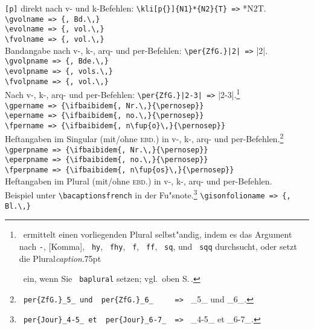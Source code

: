 \documentclass[12pt,a4paper]{article}
\newcommand{\pdfko}[1]{\kern #1pt
                          \strut\ignorespaces}%
\newcommand{\pbs}{\string\ \unskip}
\newcommand{\bs}{\protect\pbs}
\begin{document}
{\verb|[p]| direkt nach v- und k-Befehlen: \verb|\kli[p{}]{N1}*{N2}{T} =>| *{N2}{T}.
\\[.8ex]%
\verb|\gvolname => {, Bd.\,}| \\[-.8ex]
\verb|\evolname => {, vol.\,}| \\[-.8ex]
\verb|\fvolname => {, vol.\,}| \\[-.2ex]
Bandangabe nach v-, k-, arq- und per-Befehlen: \verb+\per{ZfG.}|2| =>+ |2|.
\\[.8ex]%
\verb|\gvolpname => {, Bde.\,}| \\[-.8ex]
\verb|\evolpname => {, vols.\,}| \\[-.8ex]
\verb|\fvolpname => {, vol.\,}| \\[-.2ex]
Nach v-, k-, arq- und per-Befehlen: 
\verb+\per{ZfG.}|2-3| =>+ |2-3|.\footnote{\BibArts\ ermittelt
 einen vorliegenden Plural selbst"andig, indem es das Argument nach 
 \texttt{-}, [Komma], \texttt{\bs hy}, \texttt{\bs fhy}, \texttt{\bs f}, 
 \texttt{\bs ff}, \texttt{\bs sq}, und \texttt{\bs sqq} durchsucht,
 oder setzt die Plural\hy \textit{caption}\pdfko{.75}\ 
 ein, wenn Sie \texttt{\bs baplural} setzen; vgl.\ oben S.\,\pageref{baplural}.}
\\[.8ex]%
\verb|\gpername => {\ifbaibidem{, Nr.\,}{\pernosep}}| \\[-.8ex]
\verb|\epername => {\ifbaibidem{, no.\,}{\pernosep}}| \\[-.8ex]
\verb|\fpername => {\ifbaibidem{, n\fup{o}\,}{\pernosep}}| \\[-.2ex]
Heftangaben im Singular (mit/ohne \textsc{ebd.}) in v-, k-, arq- und per-Befehlen.\footnote{
 \texttt{\bs per\{ZfG.\}\_5\_ und \bs per\{ZfG.\}\_6\_ \ \ \ \ => } 
 _5_ und \per{ZfG.}_6_.}
\\[.8ex]%
\verb|\gperpname => {\ifbaibidem{, Nr.\,}{\pernosep}}| \\[-.8ex]
\verb|\eperpname => {\ifbaibidem{, no.\,}{\pernosep}}| \\[-.8ex]
\verb|\fperpname => {\ifbaibidem{, n\fup{os}\,}{\pernosep}}| \\[-.2ex]
Heftangaben im Plural (mit/ohne \textsc{ebd.}) in v-, k-, arq- und per-Befehlen. \\[-.2ex]
Beispiel unter \verb|\bacaptionsfrench| in der Fu"snote.\footnote{\bacaptionsfrench
 \texttt{\bs per\{Jour\}\_4-5\_ et \bs per\{Jour\}\_6-7\_ \ => }
 _4-5_ et \printonlyper{Jour}_6-7_.}
\newpage\noindent%
\verb|\gisonfolioname => {, Bl.\,}| \\[-.8ex]
}
\end{document}

